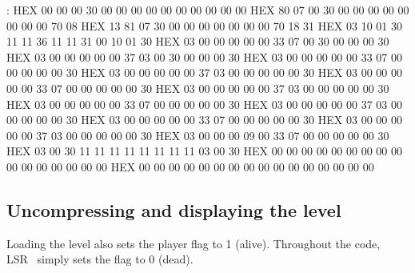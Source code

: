 \documentclass[10pt]{report}%
\begin{document}
:
    HEX     00 00 00 30 00 00 00 00 00 00 00 00 00 00
    HEX     80 07 00 30 00 00 00 00 00 00 00 00 70 08
    HEX     13 81 07 30 00 00 00 00 00 00 00 70 18 31
    HEX     03 10 01 30 11 11 36 11 11 31 00 10 01 30
    HEX     03 00 00 00 00 00 33 07 00 30 00 00 00 30
    HEX     03 00 00 00 00 00 37 03 00 30 00 00 00 30
    HEX     03 00 00 00 00 00 33 07 00 00 00 00 00 30
    HEX     03 00 00 00 00 00 37 03 00 00 00 00 00 30 
    HEX     03 00 00 00 00 00 33 07 00 00 00 00 00 30
    HEX     03 00 00 00 00 00 37 03 00 00 00 00 00 30
    HEX     03 00 00 00 00 00 33 07 00 00 00 00 00 30
    HEX     03 00 00 00 00 00 37 03 00 00 00 00 00 30
    HEX     03 00 00 00 00 00 33 07 00 00 00 00 00 30
    HEX     03 00 00 00 00 00 37 03 00 00 00 00 00 30
    HEX     03 00 00 00 09 00 33 07 00 00 00 00 00 30
    HEX     03 00 30 11 11 11 11 11 11 11 11 03 00 30 
    HEX     00 00 00 00 00 00 00 00 00 00 00 00 00 00 00 00 
    HEX     00 00 00 00 00 00 00 00 00 00 00 00 00 00 00 00
\eatline
{}\nwendcode{}\nwdocspar
\subsection{Uncompressing and displaying the level}

Loading the level also sets the player {\Tt{}\nwendquote} flag to {\Tt{}1\nwendquote} (alive). Throughout
the code, {\Tt{}LSR\ \nwendquote} simply sets the flag to {\Tt{}0\nwendquote} (dead).
\end{document}
